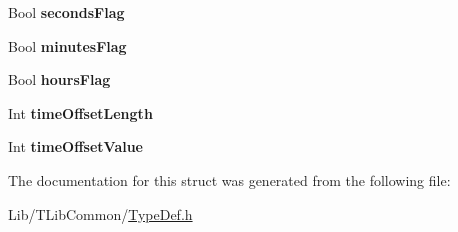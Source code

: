 \begin{DoxyCompactItemize}
\item 
\mbox{\label{struct_t_com_s_e_i_time_set_ac07144939d70d6e6a2f22ec247709088}} 
Bool {\bfseries seconds\+Flag}
\item 
\mbox{\label{struct_t_com_s_e_i_time_set_a37e5ea34539eeae08523dc3deb09677e}} 
Bool {\bfseries minutes\+Flag}
\item 
\mbox{\label{struct_t_com_s_e_i_time_set_a24a1a9536204e3e28c6bc0860b1f412d}} 
Bool {\bfseries hours\+Flag}
\item 
\mbox{\label{struct_t_com_s_e_i_time_set_af7d9b53e4dfff3e81c09450adf8fbece}} 
Int {\bfseries time\+Offset\+Length}
\item 
\mbox{\label{struct_t_com_s_e_i_time_set_affb41ae7454da767622f140aec203dbf}} 
Int {\bfseries time\+Offset\+Value}
\end{DoxyCompactItemize}


The documentation for this struct was generated from the following file\+:\begin{DoxyCompactItemize}
\item 
Lib/\+T\+Lib\+Common/\hyperlink{_type_def_8h}{Type\+Def.\+h}\end{DoxyCompactItemize}
